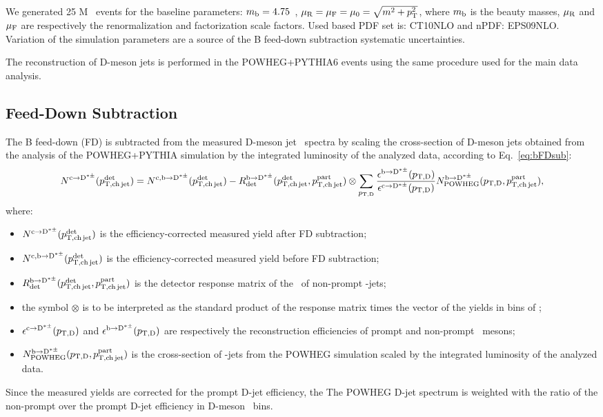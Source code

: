 We generated 25 M \bbbar\ events for the baseline parameters: 
$m_{\rm b} = 4.75$~\GeVcsq, $\mu_{\rm R} = \mu_{\rm F} =\mu_{0} = \sqrt{m^2+p_{\rm T}^2}$,
where $m_{\rm b}$ is the beauty masses, $\mu_{\rm R}$ and $\mu_{\rm F}$ are respectively the renormalization and factorization scale factors.  Used based PDF set is: CT10NLO and nPDF: EPS09NLO.
Variation of the simulation parameters are a source of the B feed-down subtraction systematic uncertainties.


The reconstruction of D-meson jets is performed in the POWHEG+PYTHIA6 events using the same procedure used for the main data analysis.

\subsection{Feed-Down Subtraction}
The B feed-down (FD) is subtracted from the measured D-meson jet \pt\ spectra by scaling the cross-section of D-meson jets obtained from the analysis of the POWHEG+PYTHIA simulation by the integrated luminosity of the analyzed data, according to Eq.~\ref{eq:bFDsub}:
\begin{equation}
N^{\rm c\rightarrow\mathrm{D^{*\pm}}}(p_{\mathrm{T,ch\,jet}}^{\mathrm{det}}) = 
N^{\rm c,b\rightarrow\mathrm{D^{*\pm}}}(p_{\mathrm{T,ch\,jet}}^{\mathrm{det}}) - 
R_{\rm det}^{\rm b\rightarrow\mathrm{D^{*\pm}}}(p_{\mathrm{T,ch\,jet}}^{\mathrm{det}},p_{\mathrm{T,ch\,jet}}^{\mathrm{part}}) \otimes \sum_{p_{\mathrm{T,D}}} \frac{\epsilon^{\rm b\rightarrow\mathrm{D^{*\pm}}}(p_{\mathrm{T,D}})}{\epsilon^{\rm c\rightarrow\mathrm{D^{*\pm}}}(p_{\mathrm{T,D}})} N^{\rm b\rightarrow\mathrm{D^{*\pm}}}_{\rm POWHEG}(p_{\mathrm{T,D}},p_{\mathrm{T,ch\,jet}}^{\mathrm{part}}),
\label{eq:bFDsub}
\end{equation}
where:
\begin{itemize}
\item $N^{\rm c\rightarrow\mathrm{D^{*\pm}}}(p_{\mathrm{T,ch\,jet}}^{\mathrm{det}})$ is the efficiency-corrected measured yield after FD subtraction; 
\item $N^{\rm c,b\rightarrow\mathrm{D^{*\pm}}}(p_{\mathrm{T,ch\,jet}}^{\mathrm{det}})$ is the efficiency-corrected measured yield before FD subtraction;
\item $R_{\rm det}^{\rm b\rightarrow\mathrm{D^{*\pm}}}(p_{\mathrm{T,ch\,jet}}^{\mathrm{det}},p_{\mathrm{T,ch\,jet}}^{\mathrm{part}})$ is the detector response matrix of the \pt\ of non-prompt \Dstar-jets;
\item the symbol $\otimes$ is to be interpreted as the standard product of the response matrix times the vector of the yields in bins of \ptchjetgen;
\item $\epsilon^{\rm c\rightarrow\mathrm{D^{*\pm}}}(p_{\mathrm{T,D}})$ and $\epsilon^{\rm b\rightarrow\mathrm{D^{*\pm}}}(p_{\mathrm{T,D}})$ are respectively the reconstruction efficiencies of prompt and non-prompt \Dstar\ mesons;
\item $N^{\rm b\rightarrow\mathrm{D^{*\pm}}}_{\rm POWHEG}(p_{\mathrm{T,D}},p_{\mathrm{T,ch\,jet}}^{\mathrm{part}})$ is the cross-section of \Dstar-jets from the POWHEG simulation scaled by the integrated luminosity of the analyzed data.
\end{itemize}
Since the measured yields are corrected for the prompt D-jet efficiency, the The POWHEG D-jet spectrum is weighted with the ratio of the non-prompt over the prompt D-jet efficiency in D-meson \pt\ bins.

